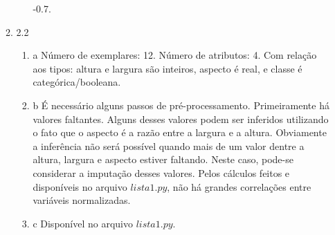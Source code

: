 \documentclass[11pt]{article}
\begin{document}
\begin{enumerate}
\begin{enumerate}
\begin{enumerate}
                        -0.7.
                \end{enumerate}
            \item{2.2}
                \begin{enumerate}
                    \item{a} Número de exemplares: 12. Número de atributos: 4. Com
                        relação aos tipos: altura e largura são inteiros,
                        aspecto é real, e classe é categórica/booleana.
                    \item{b} É necessário alguns passos de pré-processamento.
                        Primeiramente há valores faltantes. Alguns desses
                        valores podem ser inferidos utilizando o fato que o
                        aspecto é a razão entre a largura e a altura.
                        Obviamente a inferência não será possível quando mais
                        de um valor dentre a altura, largura e aspecto estiver
                        faltando. Neste caso, pode-se considerar a imputação
                        desses valores. Pelos cálculos feitos e disponíveis no
                        arquivo $lista1.py$, não há grandes correlações entre
                        variáveis normalizadas.
                    \item{c} Disponível no arquivo $lista1.py$.
                \end{enumerate}
        \end{enumerate}
\end{enumerate}
\end{document}
